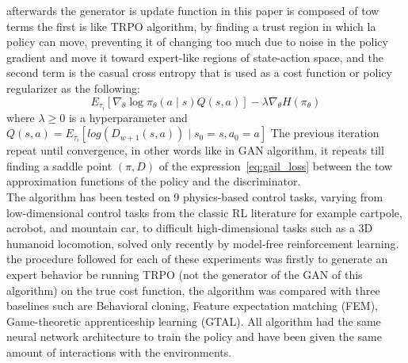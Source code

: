 afterwards the generator is update function in this paper is composed of tow terms the first is like TRPO algorithm, by finding a trust region in which la policy can move, preventing it of changing too much due to noise in the policy gradient and move it toward expert-like regions of state-action space, and the second term is the casual cross entropy that is used as a cost function or policy regularizer as the following:
\begin{equation}
	E_{\tau_i}[\nabla_{\theta}\log{\pi_{\theta}(a \mid s)}Q(s,a)] - \lambda \nabla_{\theta} H(\pi_{\theta})
\label{eq:gail_loss}
\end{equation}
where $\lambda \geqslant 0$ is a hyperparameter and $Q(s,a) = E_{\tau_i}[log{(D_{w+1}(s,a))} \mid s_0=s,a_0 = a]$
The previous iteration repeat until convergence, in other words like in GAN algorithm, it repeats till finding a saddle point $(\pi, D)$ of the expression~\ref{eq:gail_loss} between the tow approximation functions of the policy and the discriminator.\\
The algorithm has been tested on 9 physics-based control tasks, varying from low-dimensional control tasks from the classic RL literature for example cartpole, acrobot, and mountain
car, to difficult high-dimensional tasks such as a 3D humanoid locomotion, solved only recently
by model-free reinforcement learning. the procedure followed for each of these experiments was firstly to generate an expert behavior be running TRPO (not the generator of the GAN of this algorithm) on the true cost function, the algorithm was compared with three baselines such are Behavioral cloning, Feature expectation matching (FEM), Game-theoretic apprenticeship learning (GTAL). All algorithm had the same neural network architecture to train the policy and have been given the same amount of interactions with the environments.

